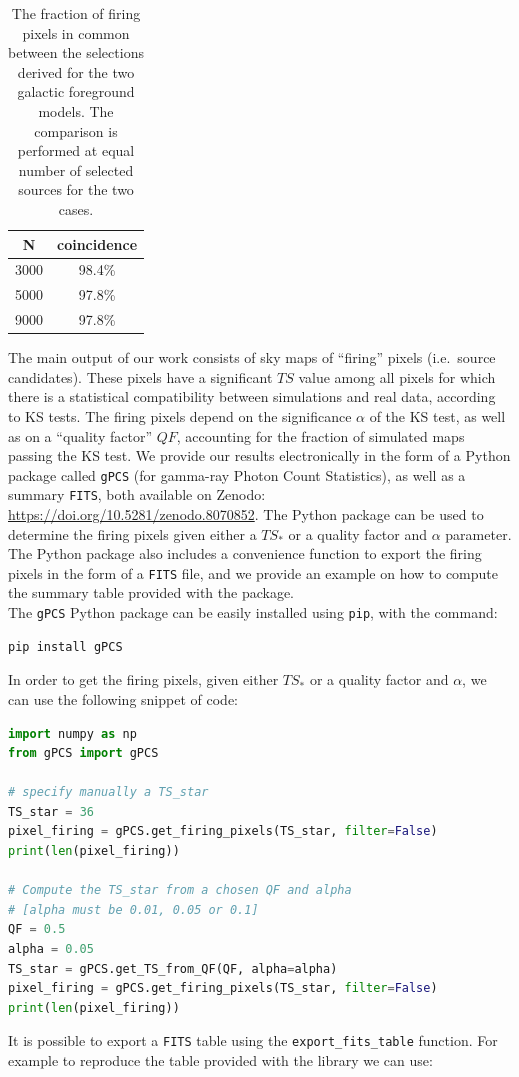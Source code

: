 \begin{table}[t]
    \renewcommand{\arraystretch}{1.2}
    \centering
    \begin{tabular}{|c|c|}  
    \hline
        N &  coincidence  \\
        \hline 
       3000 & 98.4\% \\
        \hline 
       5000 & 97.8\% \\
        \hline 
       9000 & 97.8\% \\
       \hline
    \end{tabular}
\caption{The fraction of firing pixels in common between the selections derived for the two galactic foreground models. The comparison is performed at equal number of selected sources for the two cases.}  
\label{tab:bck_comp}
\end{table}


The main output of our work consists of sky maps of ``firing'' pixels (i.e.~source candidates). These pixels have a significant $TS$ value among all pixels for which there is a statistical compatibility between simulations and real data, according to KS tests. The firing pixels depend on the significance $\alpha$ of the KS test, as well as on a ``quality factor'' $QF$, accounting for the fraction of simulated maps passing the KS test.
We provide our results electronically in the form of a Python package called \verb|gPCS|  (for gamma-ray Photon Count Statistics), as well as a summary \verb|FITS|, both available on Zenodo: \href{https://doi.org/10.5281/zenodo.8070852}{https://doi.org/10.5281/zenodo.8070852}. The Python package can be used to determine the firing pixels given either a $TS_*$ or a quality factor and $\alpha$ parameter. The Python package also includes a convenience function to export the firing pixels in the form of a \verb|FITS| file, and we provide an example on how to compute the summary table provided with the package.
\\
The \verb|gPCS| Python package can be easily installed using \verb|pip|, with the command:
\begin{lstlisting}[language=Python]
pip install gPCS
\end{lstlisting}
In order to get the firing pixels, given either $TS_*$ or a quality factor and $\alpha$, we can use the following snippet of code:

\begin{lstlisting}[language=Python]
import numpy as np
from gPCS import gPCS

# specify manually a TS_star
TS_star = 36
pixel_firing = gPCS.get_firing_pixels(TS_star, filter=False)
print(len(pixel_firing))

# Compute the TS_star from a chosen QF and alpha
# [alpha must be 0.01, 0.05 or 0.1]
QF = 0.5
alpha = 0.05
TS_star = gPCS.get_TS_from_QF(QF, alpha=alpha)
pixel_firing = gPCS.get_firing_pixels(TS_star, filter=False)
print(len(pixel_firing))
\end{lstlisting}
It is possible to export a \verb|FITS| table using the \verb|export_fits_table| function. For example to reproduce the table provided with the library we can use:

